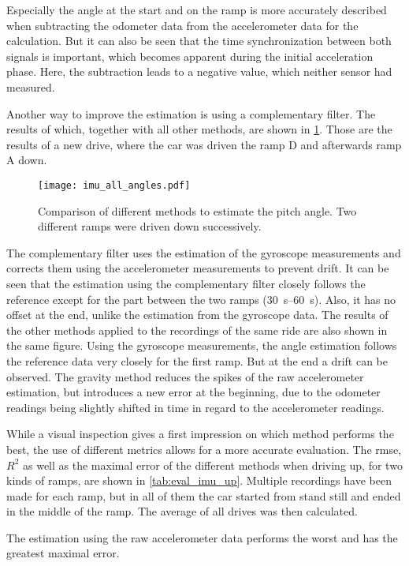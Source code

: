 Especially the angle at the start and on the ramp is more accurately described when subtracting the odometer data from the accelerometer data for the calculation.
But it can also be seen that the time synchronization between both signals is important, which becomes apparent during the initial acceleration phase.
Here, the subtraction leads to a negative value, which neither sensor had measured.\par
Another way to improve the estimation is using a complementary filter.
The results of which, together with all other methods, are shown in \cref{fig:imu_all_angles}.
Those are the results of a new drive, where the car was driven the ramp D and afterwards ramp A down.
\begin{figure}[htb]
    \centering
    \texttt{[image: imu\_all\_angles.pdf]}
    \caption[Angle estimation comparison of all methods]{Comparison of different methods to estimate the pitch angle. Two different ramps were driven down successively.}
    \label{fig:imu_all_angles}
\end{figure}
The complementary filter uses the estimation of the gyroscope measurements and corrects them using the accelerometer measurements to prevent drift.
It can be seen that the estimation using the complementary filter closely follows the reference except for the part between the two ramps (\SIrange{30}{60}{\second}).
Also, it has no offset at the end, unlike the estimation from the gyroscope data.
The results of the other methods applied to the recordings of the same ride are also shown in the same figure.
Using the gyroscope measurements, the angle estimation follows the reference data very closely for the first ramp.
But at the end a drift can be observed.
The gravity method reduces the spikes of the raw accelerometer estimation, but introduces a new error at the beginning, due to the odometer readings being slightly shifted in time in regard to the accelerometer readings.\par
While a visual inspection gives a first impression on which method performs the best, the use of different metrics allows for a more accurate evaluation.
The \gls{rmse}, $R^2$ as well as the maximal error of the different methods when driving up, for two kinds of ramps, are shown in \cref{tab:eval_imu_up}.
Multiple recordings have been made for each ramp, but in all of them the car started from stand still and ended in the middle of the ramp.
The average of all drives was then calculated.\par
The estimation using the raw accelerometer data performs the worst and has the greatest maximal error.
